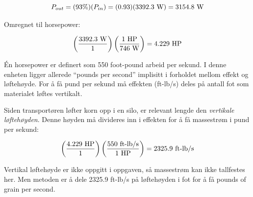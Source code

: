 $$P_{out} = (93\%) (P_{in}) = (0.93) (3392.3 \hbox{ W}) = 3154.8 \hbox{ W}$$

Omregnet til horsepower:

$$\left(3392.3 \hbox{ W} \over 1 \right)  \left(1 \hbox{ HP} \over 746 \hbox{ W}\right) = 4.229 \hbox{ HP}$$

\vskip 10pt

Én horsepower er definert som 550 foot-pound arbeid per sekund. I denne enheten ligger allerede ``pounds per second'' implisitt i forholdet mellom effekt og løftehøyde. For å få pund per sekund må effekten (ft-lb/s) deles på antall fot som materialet løftes vertikalt.

Siden transportøren løfter korn opp i en silo, er relevant lengde den {\it vertikale løftehøyden}. Denne høyden må divideres inn i effekten for å få massestrøm i pund per sekund:

$$\left(4.229 \hbox{ HP} \over 1 \right)  \left( 550 \hbox{ ft-lb/s} \over 1 \hbox{ HP} \right) = 2325.9 \hbox{ ft-lb/s}$$

Vertikal løftehøyde er ikke oppgitt i oppgaven, så massestrøm kan ikke tallfestes her. Men metoden er å dele 2325.9 ft-lb/s på løftehøyden i fot for å få pounds of grain per second.


